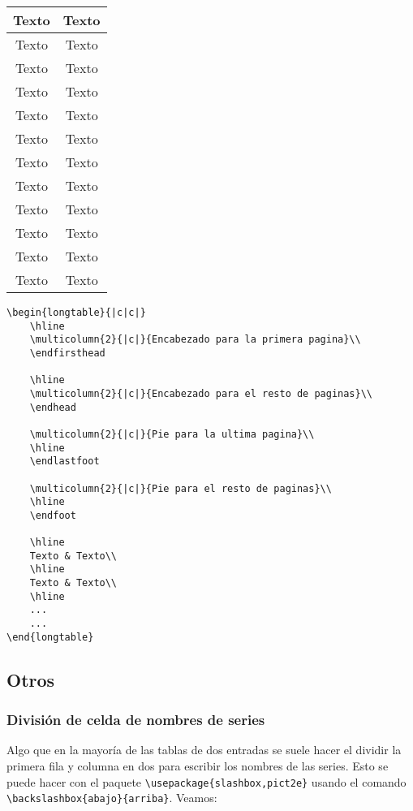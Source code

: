 \begin{longtable}{|c|c|}
		Texto & Texto\\
		\hline
		Texto & Texto\\
		\hline
		Texto & Texto\\
		\hline
		Texto & Texto\\
		\hline
		Texto & Texto\\
		\hline
		Texto & Texto\\
		\hline
		Texto & Texto\\
		\hline
		Texto & Texto\\
		\hline
		Texto & Texto\\
		\hline
		Texto & Texto\\
		\hline
		Texto & Texto\\
		\hline
		Texto & Texto\\
		\hline
	\end{longtable}
	
	
	\begin{myquote}
		\begin{lstlisting}
\begin{longtable}{|c|c|}
	\hline 
	\multicolumn{2}{|c|}{Encabezado para la primera pagina}\\		
	\endfirsthead
	
	\hline
	\multicolumn{2}{|c|}{Encabezado para el resto de paginas}\\		
	\endhead		
	
	\multicolumn{2}{|c|}{Pie para la ultima pagina}\\
	\hline
	\endlastfoot
	
	\multicolumn{2}{|c|}{Pie para el resto de paginas}\\
	\hline
	\endfoot
	
	\hline
	Texto & Texto\\
	\hline
	Texto & Texto\\
	\hline
	...
	...
\end{longtable}			
		\end{lstlisting}		
	\end{myquote}
	
	
	\subsection{Otros}
	
	\subsubsection{División de celda de nombres de series}
	
	Algo que en la mayoría de las tablas de dos entradas se suele hacer el dividir la primera fila y columna en dos para escribir los nombres de las series. Esto se puede hacer con el paquete \verb|\usepackage{slashbox,pict2e}| usando el comando \verb|\backslashbox{abajo}{arriba}|. Veamos:
	
